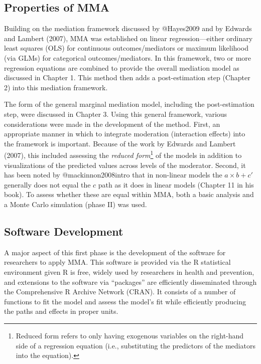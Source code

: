 \documentclass[]{article}
\let\rmarkdownfootnote\footnote%
\def\footnote{\protect\rmarkdownfootnote}
\begin{document}
\subsection{Properties of MMA}\label{properties-of-mma}

Building on the mediation framework discussed by @Hayes2009 and by
Edwards and Lambert (2007), MMA was established on linear
regression---either ordinary least squares (OLS) for continuous
outcomes/mediators or maximum likelihood (via GLMs) for categorical
outcomes/mediators. In this framework, two or more regression equations
are combined to provide the overall mediation model as discussed in
Chapter 1. This method then adds a post-estimation step (Chapter 2) into
this mediation framework.

The form of the general marginal mediation model, including the
post-estimation step, were discussed in Chapter 3. Using this general
framework, various considerations were made in the development of the
method. First, an appropriate manner in which to integrate moderation
(interaction effects) into the framework is important. Because of the
work by Edwards and Lambert (2007), this included assessing the
\emph{reduced
form}\footnote{Reduced form refers to only having exogenous variables on the right-hand side of a regression equation (i.e., substituting the predictors of the mediators into the equation).}
of the models in addition to visualizations of the predicted values
across levels of the moderator. Second, it has been noted by
@mackinnon2008intro that in non-linear models the \(a \times b + c'\)
generally does not equal the \(c\) path as it does in linear models
(Chapter 11 in his book). To assess whether these are equal within MMA,
both a basic analysis and a Monte Carlo simulation (phase II) was used.

\subsection{Software Development}\label{software-development}

A major aspect of this first phase is the development of the software
for researchers to apply MMA. This software is provided via the R
statistical environment given R is free, widely used by researchers in
health and prevention, and extensions to the software via ``packages''
are efficiently disseminated through the Comprehensive R Archive Network
(CRAN). It consists of a number of functions to fit the model and assess
the model's fit while efficiently producing the paths and effects in
proper units.
\end{document}
